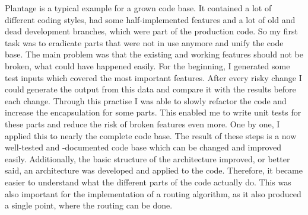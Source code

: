 Plantage is a typical example for a grown code base. It contained a lot of different coding styles, had some half-implemented features and a lot of old and dead development branches, which were part of the production code. So my first task was to eradicate parts that were not in use anymore and unify the code base. The main problem was that the existing and working features should not be broken, what could have happened easily. For the beginning, I generated some test inputs which covered the most important features. After every risky change I could generate the output from this data and compare it with the results before each change. Through this practise I was able to slowly refactor the code and increase the encapsulation for some parts. This enabled me to write unit tests for these parts and reduce the risk of broken features even more. One by one, I applied this to nearly the complete code base. The result of these steps is a now well-tested and -documented code base which can be changed and improved easily. Additionally, the basic structure of the architecture improved, or better said, an architecture was developed and applied to the code. Therefore, it became easier to understand what the different parts of the code actually do. This was also important for the implementation of a routing algorithm, as it also produced a single point, where the routing can be done.